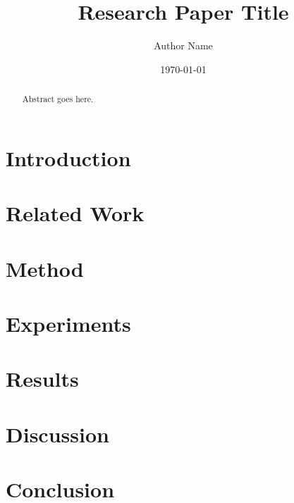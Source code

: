 \documentclass[11pt]{article}
\title{Research Paper Title}
\author{Author Name}
\date{\today}
\begin{document}
\maketitle

\begin{abstract}
Abstract goes here.
\end{abstract}

\section{Introduction}

\section{Related Work}

\section{Method}

\section{Experiments}

\section{Results}

\section{Discussion}

\section{Conclusion}



\end{document}
